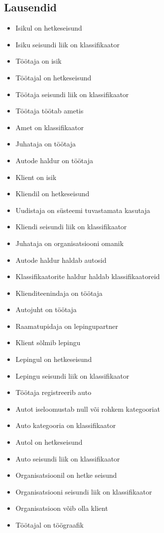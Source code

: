 \subsection{Lausendid}
\begin{itemize}
	\item Isikul on hetkeseisund
	\item Isiku seisundi liik on klassifikaator
	\item Töötaja on isik
	\item Töötajal on hetkeseisund
	\item Töötaja seisundi liik on klassifikaator
	\item Töötaja töötab ametis
	\item Amet on klassifikaator
	\item Juhataja on töötaja
	\item Autode haldur on töötaja
	\item Klient on isik
	\item Kliendil on hetkeseisund
	\item Uudistaja on süsteemi tuvastamata kasutaja
	\item Kliendi seisundi liik on klassifikaator
	\item Juhataja on organisatsiooni omanik
	\item Autode haldur haldab autosid
	\item Klassifikaatorite haldur haldab klassifikaatoreid
	\item Klienditeenindaja on töötaja
	\item Autojuht on töötaja
	\item Raamatupidaja on lepingupartner
	\item Klient sõlmib lepingu
	\item Lepingul on hetkeseisund
	\item Lepingu seisundi liik on klassifikaator
	\item Töötaja registreerib auto
	\item Autot iseloomustab null või rohkem kategooriat
	\item Auto kategooria on klassifikaator
	\item Autol on hetkeseisund
	\item Auto seisundi liik on klassifikaator
	\item Organisatsioonil on hetke seisund
	\item Organisatsiooni seisundi liik on klassifikaator
	\item Organisatsioon võib olla klient
	\item Töötajal on töögraafik

\end{itemize}
